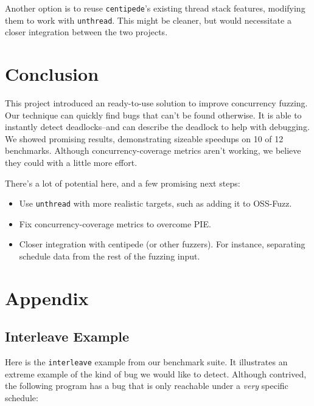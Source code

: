 \documentclass{article}
\begin{document}
Another option is to reuse \texttt{centipede}'s existing thread stack features, modifying them to work with \texttt{unthread}. This might be cleaner, but would necessitate a closer integration between the two projects.

\section{Conclusion}

\sloppy

This project introduced an ready-to-use solution to improve concurrency fuzzing. Our technique can quickly find bugs that can't be found otherwise. It is able to instantly detect deadlocks--and can describe the deadlock to help with debugging. We showed promising results, demonstrating sizeable speedups on 10 of 12 benchmarks. Although concurrency-coverage metrics aren't working, we believe they could with a little more effort.

There's a lot of potential here, and a few promising next steps:

\begin{itemize}
    \item Use \texttt{unthread} with more realistic targets, such as adding it to OSS-Fuzz\cite{oss-fuzz}.
    \item Fix concurrency-coverage metrics to overcome PIE.
    \item Closer integration with centipede (or other fuzzers). For instance, separating schedule data from the rest of the fuzzing input.
\end{itemize}

\newpage

\nocite{*}
\printbibliography

\section{Appendix}

\subsection{Interleave Example} \label{interleave}

Here is the \texttt{interleave} example from our benchmark suite. It illustrates an extreme example of the kind of bug we would like to detect. Although contrived, the following program has a bug that is only reachable under a \textit{very} specific schedule: 
\end{document}
